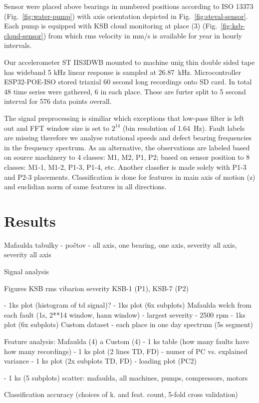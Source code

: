 \documentclass{llncs}
\begin{document}
Sensor were placed above bearings in numbered positions according to ISO 13373 (Fig.~\ref{fig:water-pump}) with axis orientation depicted in Fig.~\ref{fig:steval-sensor}. Each pump is equipped with KSB cloud monitoring at place (3) (Fig.~\ref{fig:ksb-cloud-sensor}) from which rms velocity in mm/s is available for year in hourly intervals. 

Our accelerometer ST IIS3DWB mounted to machine unig thin double sided tape has wideband 5 kHz linear response is sampled at 26.87~kHz. Microcontroller ESP32-POE-ISO stored triaxial 60 second long recordings onto SD card. In total 48 time series were gathered, 6 in each place. These are furter split to 5 second interval for 576 data points overall.

The signal preprocessing is similiar which exceptions that low-pass filter is left out and FFT window size is set to $2^{14}$ (bin resolution of 1.64~Hz). Fault labels are missing therefore we analyse rotational speeds and defect bearing frequencies in the frequency spectrum. As an alternative, the observations are labeled based on source machinery to 4 classes: M1, M2, P1, P2; based on sensor position to 8 classes: M1-1, M1-2, P1-3, P1-4, etc. Another classfier is made solely with P1-3 and P2-3 placements.
Classification is done for features in main axis of motion (z) and euclidian norm of same features in all directions.


\section{Results}
Mafaulda tabulky - počtov - all axis, one bearing, one axis, severity all axis, severity all axis

Signal analysis

Figures KSB rms vibarion severity KSB-1 (P1), KSB-7 (P2)

- 1ks plot (histogram of td signal)?
- 1ks plot (6x subplots) Mafaulda welch from each fault (1s, 2**14 window, hann window)  - largest severity - 2500 rpm
- 1ks plot (6x subplots) Custom dataset - each place in one day spectrum (5s segment)

Feature analysis:
Mafaulda (4) a Custom (4) 
- 1 ks table (how many faults have how many recordings)
- 1 ks plot (2 lines TD, FD) - numer of PC vs. explained variance
- 1 ks plot (2x subplots TD, FD) - loading plot (PC2)

- 1 ks (5 subplots) scatter: mafaulda, all machines, pumps, compressors, motors


Classification accuracy (choices of k. and feat. count, 5-fold cross validation)
\end{document}
